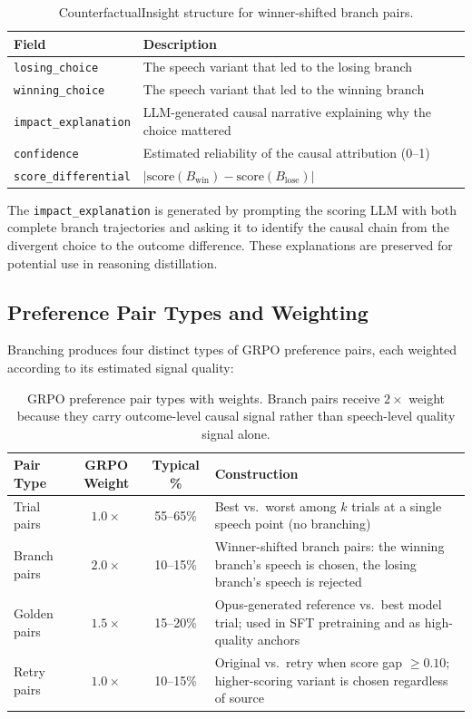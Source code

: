 \begin{table}[h]
\centering
\small
\begin{tabular}{lp{8cm}}
\toprule
\textbf{Field} & \textbf{Description} \\
\midrule
\texttt{losing\_choice} & The speech variant that led to the losing branch \\
\texttt{winning\_choice} & The speech variant that led to the winning branch \\
\texttt{impact\_explanation} & LLM-generated causal narrative explaining why the choice mattered \\
\texttt{confidence} & Estimated reliability of the causal attribution (0--1) \\
\texttt{score\_differential} & $|\text{score}(B_\text{win}) - \text{score}(B_\text{lose})|$ \\
\bottomrule
\end{tabular}
\caption{CounterfactualInsight structure for winner-shifted branch pairs.}
\label{tab:counterfactual_insight}
\end{table}

The \texttt{impact\_explanation} is generated by prompting the scoring LLM
with both complete branch trajectories and asking it to identify the causal
chain from the divergent choice to the outcome difference. These explanations
are preserved for potential use in reasoning distillation.

\subsection{Preference Pair Types and Weighting}

Branching produces four distinct types of GRPO preference pairs, each
weighted according to its estimated signal quality:

\begin{table}[h]
\centering
\small
\begin{tabular}{lccp{5.5cm}}
\toprule
\textbf{Pair Type} & \textbf{GRPO Weight} & \textbf{Typical \%} & \textbf{Construction} \\
\midrule
Trial pairs & $1.0\times$ & 55--65\% & Best vs.\ worst among $k$ trials at a single speech point (no branching) \\
Branch pairs & $2.0\times$ & 10--15\% & Winner-shifted branch pairs: the winning branch's speech is chosen, the losing branch's speech is rejected \\
Golden pairs & $1.5\times$ & 15--20\% & Opus-generated reference vs.\ best model trial; used in SFT pretraining and as high-quality anchors \\
Retry pairs & $1.0\times$ & 10--15\% & Original vs.\ retry when score gap $\geq 0.10$; higher-scoring variant is chosen regardless of source \\
\bottomrule
\end{tabular}
\caption{GRPO preference pair types with weights. Branch pairs receive $2\times$ weight because they carry outcome-level causal signal rather than speech-level quality signal alone.}
\label{tab:pair_types}
\end{table}

